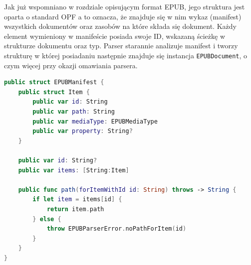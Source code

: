 Jak już wspomniano w rozdziale opisującym format EPUB, jego struktura jest oparta o standard OPF a to oznacza, że znajduje się w nim wykaz (manifest) wszystkich dokumentów oraz zasobów na które składa się dokument. Każdy element wymieniony w manifeście posiada swoje ID, wskazaną ścieżkę w strukturze dokumentu oraz typ. Parser starannie analizuje manifest i tworzy strukturę w której posiadaniu następnie znajduje się instancja \texttt{EPUBDocument}, o czym więcej przy okazji omawiania parsera.

\begin{lstlisting}[caption={Struktura EPUBManifest}, language=swift,label=EPUBManifest-declaration]
public struct EPUBManifest {
    public struct Item {
        public var id: String
        public var path: String
        public var mediaType: EPUBMediaType
        public var property: String?
    }

    public var id: String?
    public var items: [String:Item]

    public func path(forItemWithId id: String) throws -> String {
        if let item = items[id] {
            return item.path
        } else {
            throw EPUBParserError.noPathForItem(id)
        }
    }
}
\end{lstlisting}

